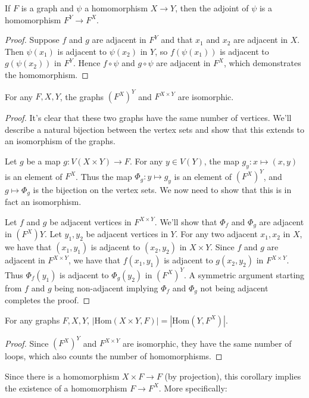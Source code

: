 
\begin{theorem}
	If $F$ is a graph and $\psi$ a homomorphism $X\rightarrow Y$, then the adjoint of $\psi$ is a homomorphism $F^Y\rightarrow F^X$.
\end{theorem}
\begin{proof}
	Suppose $f$ and $g$ are adjacent in $F^Y$ and that $x_1$ and $x_2$ are adjacent in $X$.  Then $\psi(x_1)$ is adjacent to $\psi(x_2)$ in $Y$, so $f(\psi(x_1))$ is adjacent to $g(\psi(x_2))$ in $F^Y$.  Hence $f\circ\psi$ and $g\circ\psi$ are adjacent in $F^X$, which demonstrates the homomorphism.
\end{proof}

\begin{theorem}
	For any $F,X,Y$, the graphs $(F^X)^Y$ and $F^{X\times Y}$ are isomorphic.
\end{theorem}
\begin{proof}
	It's clear that these two graphs have the same number of vertices.  We'll describe a natural bijection between the vertex sets and show that this extends to an isomorphism of the graphs.
	
	Let $g$ be a map $g:V(X\times Y)\rightarrow F$.  For any $y\in V(Y)$, the map $g_y:x\mapsto(x,y)$ is an element of $F^X$.  Thus the map $\Phi_g:y\mapsto g_y$ is an element of $(F^X)^Y$, and $g\mapsto \Phi_g$ is the bijection on the vertex sets.  We now need to show that this is in fact an isomorphism.
	
	Let $f$ and $g$ be adjacent vertices in $F^{X\times Y}$.  We'll show that $\Phi_f$ and $\Phi_g$ are adjacent in $(F^X)Y$.  Let $y_1,y_2$ be adjacent vertices in $Y$.  For any two adjacent $x_1,x_2$ in $X$, we have that $(x_1,y_1)$ is adjacent to $(x_2,y_2)$ in $X\times Y$.  Since $f$ and $g$ are adjacent in $F^{X\times Y}$, we have that $f(x_1,y_1)$ is adjacent to $g(x_2,y_2)$ in $F^{X\times Y}$.  Thus $\Phi_f(y_1)$ is adjacent to $\Phi_g(y_2)$ in $(F^X)^Y$.  A symmetric argument starting from $f$ and $g$ being non-adjacent implying $\Phi_f$ and $\Phi_g$ not being adjacent completes the proof.
\end{proof}

\begin{corollary}
	For any graphs $F,X,Y$, $|\mathrm{Hom}(X\times Y,F)|=|\mathrm{Hom}(Y,F^X)|$.
\end{corollary}
\begin{proof}
	Since $(F^X)^Y$ and $F^{X\times Y}$ are isomorphic, they have the same number of loops, which also counts the number of homomorphisms.
\end{proof}
Since there is a homomorphism $X\times F\rightarrow F$ (by projection), this corollary implies the existence of a homomorphism $F\rightarrow F^X$.  More specifically:

